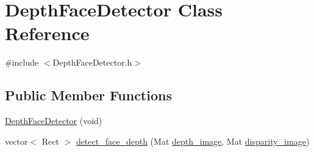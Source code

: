 \hypertarget{classDepthFaceDetector}{\section{Depth\-Face\-Detector Class Reference}
\label{classDepthFaceDetector}
}


{\ttfamily \#include $<$Depth\-Face\-Detector.\-h$>$}

\subsection*{Public Member Functions}
\begin{DoxyCompactItemize}
\item 
\hyperlink{classDepthFaceDetector_a1efe4e883faaad6a33acd0909e1ec282}{Depth\-Face\-Detector} (void)
\item 
vector$<$ Rect $>$ \hyperlink{classDepthFaceDetector_ace3a3506a58be0d500d866d1574a35be}{detect\-\_\-face\-\_\-depth} (Mat \hyperlink{social__robot__onethread_8cpp_a5b613972ff73fd7b34e0ee18acc5c1a6}{depth\-\_\-image}, Mat \hyperlink{social__robot__onethread_8cpp_a485c05800d39168b94f859fac62aa6a7}{disparity\-\_\-image})
\end{DoxyCompactItemize}
